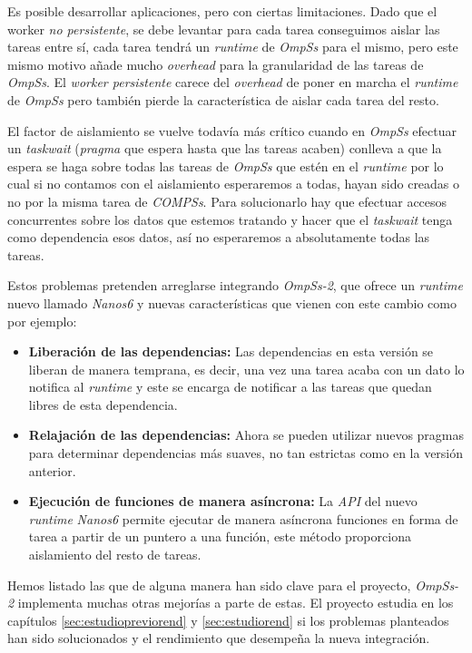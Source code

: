 Es posible desarrollar aplicaciones, pero con ciertas limitaciones. Dado que el worker \textit{no persistente}, se debe levantar para cada tarea conseguimos aislar las tareas entre sí, cada tarea tendrá un \textit{runtime} de \textit{OmpSs} para el mismo, pero este mismo motivo añade mucho \textit{overhead} para la granularidad de las tareas de \textit{OmpSs}. El \textit{worker persistente} carece del \textit{overhead} de poner en marcha el \textit{runtime} de \textit{OmpSs} pero también pierde la característica de aislar cada tarea del resto. 
\par\bigskip
El factor de aislamiento se vuelve todavía más crítico cuando en \textit{OmpSs} efectuar un \textit{taskwait} (\textit{pragma} que espera hasta que las tareas acaben) conlleva a que la espera se haga sobre todas las tareas de \textit{OmpSs} que estén en el \textit{runtime} por lo cual si no contamos con el aislamiento esperaremos a todas, hayan sido creadas o no por la misma tarea de \textit{COMPSs}. Para solucionarlo hay que efectuar accesos concurrentes sobre los datos que estemos tratando y hacer que el \textit{taskwait} tenga como dependencia esos datos, así no esperaremos a absolutamente todas las tareas.
\par\bigskip
Estos problemas pretenden arreglarse integrando \textit{OmpSs-2}, que ofrece un \textit{runtime} nuevo llamado \textit{Nanos6} y nuevas características que vienen con este cambio como por ejemplo:

\begin{itemize}
\item \textbf{Liberación de las dependencias:} Las dependencias en esta versión se liberan de manera temprana, es decir, una vez una tarea acaba con un dato lo notifica al \textit{runtime} y este se encarga de notificar a las tareas que quedan libres de esta dependencia.
 \item \textbf{Relajación de las dependencias:} Ahora se pueden utilizar nuevos pragmas para determinar dependencias más suaves, no tan estrictas como en la versión anterior.
 \item \textbf{Ejecución de funciones de manera asíncrona:} La \textit{API} del nuevo \textit{runtime} \textit{Nanos6} permite ejecutar de manera asíncrona funciones en forma de tarea a partir de un puntero a una función, este método proporciona aislamiento del resto de tareas.
\end{itemize}

Hemos listado las que de alguna manera han sido clave para el proyecto, \textit{OmpSs-2} implementa muchas otras mejorías a parte de estas\cite{OmpSs2reference}. El proyecto estudia en los capítulos \ref{sec:estudiopreviorend} y \ref{sec:estudiorend} si los problemas planteados han sido solucionados y el rendimiento que desempeña la nueva integración.

